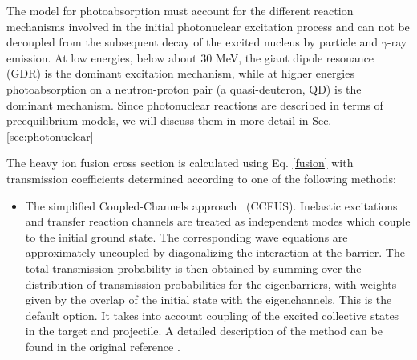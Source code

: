 The model for photoabsorption must account for the different reaction
mechanisms involved in the initial photonuclear excitation process and can
not be decoupled from the subsequent decay of the excited nucleus by
particle and $\gamma$-ray emission. At low energies, below about 30 MeV, the
giant dipole resonance (GDR) is the dominant excitation mechanism, while at
higher energies photoabsorption on a neutron-proton pair (a quasi-deuteron,
QD) is the dominant mechanism. Since photonuclear reactions are described in
terms of preequilibrium models, we will discuss them in more detail in Sec.~%
\ref{sec:photonuclear}

The heavy ion fusion cross section is calculated using Eq. \ref{fusion} with
transmission coefficients determined according to one of the following
methods:

\begin{itemize}
\item The simplified Coupled-Channels approach~\cite{CCFUS} (CCFUS).
Inelastic excitations and transfer reaction channels are treated as
independent modes which couple to the initial ground state. The
corresponding wave equations are approximately uncoupled by diagonalizing
the interaction at the barrier. The total transmission probability is then
obtained by summing over the distribution of transmission probabilities for
the eigenbarriers, with weights given by the overlap of the initial state
with the eigenchannels. This is the default option. It takes into account
coupling of the excited collective states in the target and projectile. A
detailed description of the method can be found in the original reference
\cite{CCFUS}.


\end{itemize}
